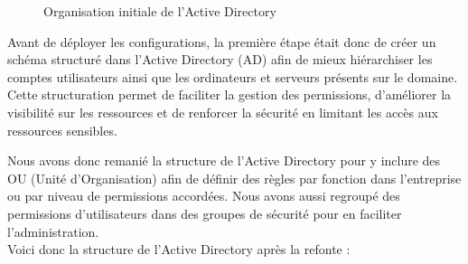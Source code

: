 \documentclass[a4paper, 11pt]{article}
\begin{document}
\begin{figure}[H]
  \centering

  \label{fig:AD-before}
  \caption{Organisation initiale de l'Active Directory}
\end{figure}
\newpage
Avant de déployer les configurations, la première étape était donc de créer un schéma structuré dans l'Active Directory (AD) afin de mieux hiérarchiser les comptes 
utilisateurs ainsi que les ordinateurs et serveurs présents sur le domaine. Cette structuration permet de faciliter la gestion 
des permissions, d'améliorer la visibilité sur les ressources et de renforcer la sécurité en limitant les accès aux ressources sensibles.
\par\bigskip
Nous avons donc remanié la structure de l'Active Directory pour y inclure des OU (Unité d'Organisation) afin de définir des règles par fonction dans l'entreprise ou par niveau de permissions accordées. Nous avons aussi regroupé des permissions d'utilisateurs dans des groupes de sécurité pour en faciliter l'administration.\\
Voici donc la structure de l'Active Directory après la refonte :\\
\end{document}
